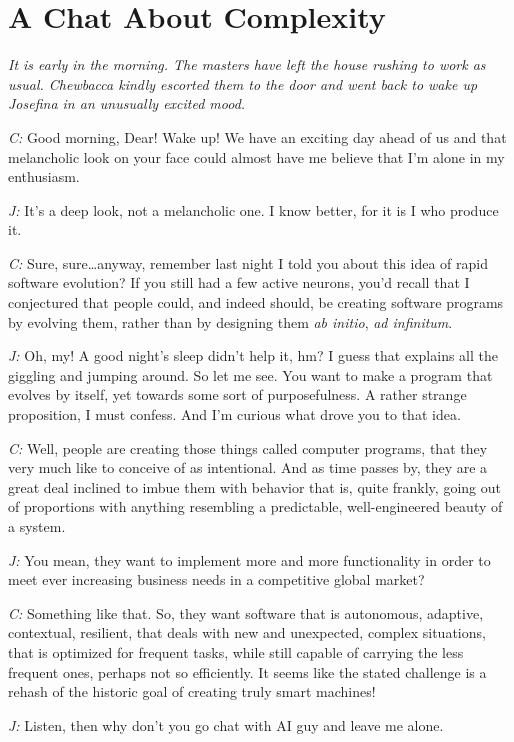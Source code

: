 \documentclass[10pt]{sigplanconf}
\begin{document}
\section{A Chat About Complexity}

\emph{It is early in the morning. The masters have left the house rushing to
work as usual. Chewbacca kindly escorted them to the door and went back to wake
up Josefina in an unusually excited mood.}

\emph{C:} Good morning, Dear! Wake up! We have an exciting day ahead of us and that melancholic look on your face could almost have me believe that I'm alone in my enthusiasm.

\emph{J:} It's a deep look, not a melancholic one. I know better, for it is I who produce it.

\emph{C:} Sure, sure\ldots anyway, remember last night I told you about this idea of rapid software evolution? If you still had a few active neurons, you'd recall that I conjectured that people could, and indeed should, be creating software programs by evolving them, rather than by designing them \emph{ab initio}, \emph{ad infinitum}.

\emph{J:} Oh, my! A good night's sleep didn't help it, hm? I guess that explains all the giggling and jumping around. So let me see. You want to make a program that evolves by itself, yet towards some sort of purposefulness. A rather strange proposition, I must confess. And I'm curious what drove you to that idea.

\emph{C:} Well, people are creating those things called computer programs, that they very much like to conceive of as intentional. And as time passes by, they are a great deal inclined to imbue them with behavior that is, quite frankly, going out of proportions with anything resembling a predictable, well-engineered beauty of a system.

\emph{J:} You mean, they want to implement more and more functionality in order to meet ever increasing business needs in a competitive global market?

\emph{C:} Something like that. So, they want software that is autonomous, adaptive, contextual, resilient, that deals with new and unexpected, complex situations, that is optimized for frequent tasks, while still capable of carrying the less frequent ones, perhaps not so efficiently. It seems like the stated challenge is a rehash of the historic goal of creating truly smart machines!

\emph{J:} Listen, then why don't you go chat with AI guy and leave me alone.
\end{document}
